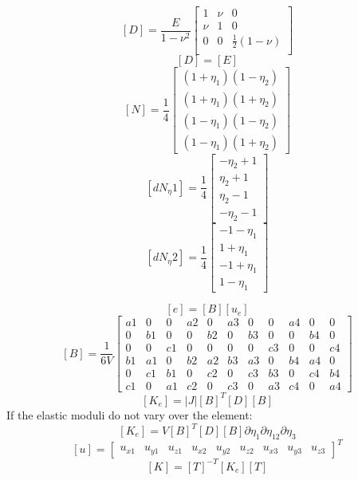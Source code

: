     \[  [D] = \frac{E}{1-\nu^2} \left[ \begin{array}{ccc}
               1   & \nu & 0  \\
               \nu & 1   & 0 \\
               0   & 0   & \frac{1}{2} (1-\nu)  \\
            \end{array}\right] \]
    \[ [D] = [E] \]
    \[ [N] = \frac{1}{4} \left[ \begin{array}{c}
               (1+\eta_1)(1-\eta_2) \\
               (1+\eta_1)(1+\eta_2) \\
               (1-\eta_1)(1-\eta_2) \\
               (1-\eta_1)(1+\eta_2)
            \end{array}\right]\]
    \[ [dN_\eta1] = \frac{1}{4} \left[ \begin{array}{c}
               -\eta_2 + 1 \\
                \eta_2 + 1 \\
                \eta_2 - 1 \\
               -\eta_2 - 1
            \end{array}\right]\]
    \[ [dN_\eta2] = \frac{1}{4} \left[ \begin{array}{c}
              -1 - \eta_1 \\
               1 + \eta_1 \\
              -1 + \eta_1 \\
               1 - \eta_1
            \end{array}\right]\]
    
    \[ [e] = [B] [u_e] \]
    \[ [B] = \frac{1}{6V}\left[ \begin{array}{cccccccccccc}
               a1 & 0  & 0  & a2 & 0  & a3 & 0  & 0  & a4 & 0  & 0  \\
               0  & b1 & 0  & 0  & b2 & 0  & b3 & 0  & 0  & b4 & 0  \\
               0  & 0  & c1 & 0  & 0  & 0  & 0  & c3 & 0  & 0  & c4 \\
               b1 & a1 & 0  & b2 & a2 & b3 & a3 & 0  & b4 & a4 & 0  \\
               0  & c1 & b1 & 0  & c2 & 0  & c3 & b3 & 0  & c4 & b4 \\
               c1 & 0  & a1 & c2 & 0  & c3 & 0  & a3 & c4 & 0  & a4 
            \end{array}\right]\]
     \[  [K_e] = |J| [B]^T [D] [B] \]
     If the elastic moduli do not vary over the element:
     \[  [K_e] = V [B]^T [D] [B] \partial \eta_1 \partial \eta_12\partial \eta_3 \]
     \[ [u] = \left[ \begin{array}{cccccccccccc}
               u_{x1} & u_{y1} & u_{z1} & 
               u_{x2} & u_{y2} & u_{z2} & 
               u_{x3} & u_{y3} & u_{z3}
            \end{array}\right]^T\]
      \[ [K] = [T]^{-T} [K_e] [T]  \]
      

